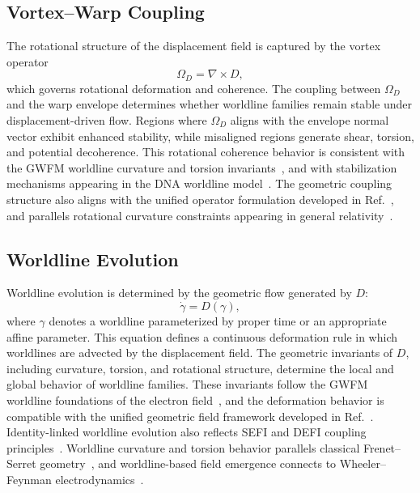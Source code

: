 \documentclass[aip,adv,reprint]{revtex4-2}
\begin{document}
\subsection{Vortex--Warp Coupling}

The rotational structure of the displacement field is captured by the vortex
operator
\begin{equation}
\Omega_D=\nabla\times D,
\end{equation}
which governs rotational deformation and coherence. The coupling between
$\Omega_D$ and the warp envelope determines whether worldline families remain
stable under displacement-driven flow. Regions where $\Omega_D$ aligns with the
envelope normal vector exhibit enhanced stability, while misaligned regions
generate shear, torsion, and potential decoherence. This rotational coherence
behavior is consistent with the GWFM worldline curvature and torsion
invariants~\cite{Dutton_GWFM_JMP_2026}, and with stabilization mechanisms
appearing in the DNA worldline model~\cite{Dutton_DNA_2026}. The geometric
coupling structure also aligns with the unified operator formulation developed
in Ref.~\cite{Dutton_Unified_JMP_2026}, and parallels rotational curvature
constraints appearing in general relativity~\cite{MTW_Gravitation_1973}.

\subsection{Worldline Evolution}

Worldline evolution is determined by the geometric flow generated by $D$:
\begin{equation}
\dot{\gamma}=D(\gamma),
\end{equation}
where $\gamma$ denotes a worldline parameterized by proper time or an
appropriate affine parameter. This equation defines a continuous deformation
rule in which worldlines are advected by the displacement field. The geometric
invariants of $D$, including curvature, torsion, and rotational structure,
determine the local and global behavior of worldline families. These invariants
follow the GWFM worldline foundations of the electron field~\cite{Dutton_GWFM_JMP_2026},
and the deformation behavior is compatible with the unified geometric field
framework developed in Ref.~\cite{Dutton_Unified_JMP_2026}. Identity-linked
worldline evolution also reflects SEFI and DEFI coupling principles~\cite{Dutton_SEFI_JMP_2026,Dutton_DEFI_2026}.
Worldline curvature and torsion behavior parallels classical Frenet--Serret
geometry~\cite{Frenet_1851,Serret_1851}, and worldline-based field emergence
connects to Wheeler--Feynman electrodynamics~\cite{Wheeler_Feynman_1945,Wheeler_Feynman_1949}.
\end{document}
